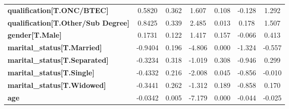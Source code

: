 \begin{center}
\begin{tabular}{lcccccc}
\textbf{qualification[T.ONC/BTEC]}          &       0.5820  &        0.362     &     1.607  &         0.108        &       -0.128    &        1.292     \\
\textbf{qualification[T.Other/Sub Degree]}  &       0.8425  &        0.339     &     2.485  &         0.013        &        0.178    &        1.507     \\
\textbf{gender[T.Male]}                     &       0.1731  &        0.122     &     1.417  &         0.157        &       -0.066    &        0.413     \\
\textbf{marital\_status[T.Married]}         &      -0.9404  &        0.196     &    -4.806  &         0.000        &       -1.324    &       -0.557     \\
\textbf{marital\_status[T.Separated]}       &      -0.3234  &        0.318     &    -1.019  &         0.308        &       -0.946    &        0.299     \\
\textbf{marital\_status[T.Single]}          &      -0.4332  &        0.216     &    -2.008  &         0.045        &       -0.856    &       -0.010     \\
\textbf{marital\_status[T.Widowed]}         &      -0.3441  &        0.262     &    -1.312  &         0.189        &       -0.858    &        0.170     \\
\textbf{age}                                &      -0.0342  &        0.005     &    -7.179  &         0.000        &       -0.044    &       -0.025     \\
\bottomrule
\end{tabular}
\end{center}
